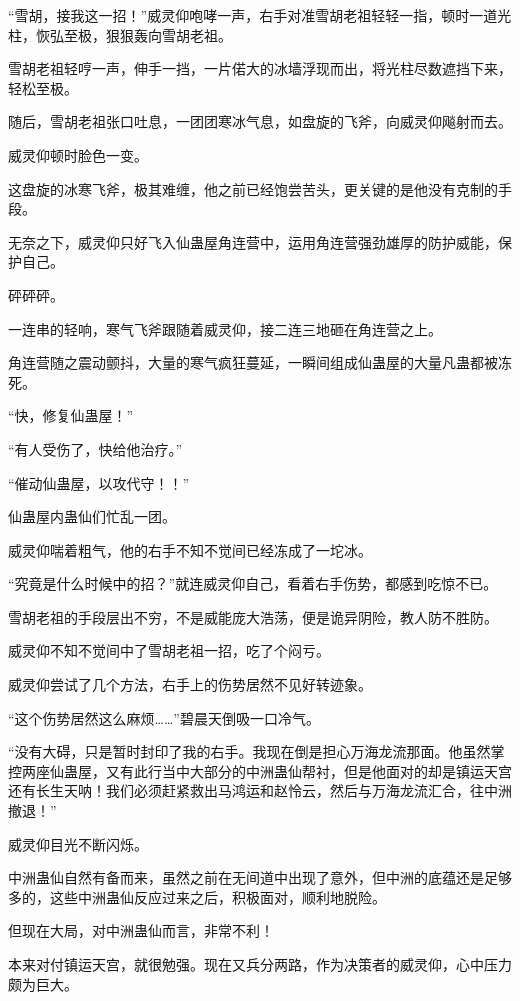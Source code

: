 
\begin{this_body}

“雪胡，接我这一招！”威灵仰咆哮一声，右手对准雪胡老祖轻轻一指，顿时一道光柱，恢弘至极，狠狠轰向雪胡老祖。

雪胡老祖轻哼一声，伸手一挡，一片偌大的冰墙浮现而出，将光柱尽数遮挡下来，轻松至极。

随后，雪胡老祖张口吐息，一团团寒冰气息，如盘旋的飞斧，向威灵仰飚射而去。

威灵仰顿时脸色一变。

这盘旋的冰寒飞斧，极其难缠，他之前已经饱尝苦头，更关键的是他没有克制的手段。

无奈之下，威灵仰只好飞入仙蛊屋角连营中，运用角连营强劲雄厚的防护威能，保护自己。

砰砰砰。

一连串的轻响，寒气飞斧跟随着威灵仰，接二连三地砸在角连营之上。

角连营随之震动颤抖，大量的寒气疯狂蔓延，一瞬间组成仙蛊屋的大量凡蛊都被冻死。

“快，修复仙蛊屋！”

“有人受伤了，快给他治疗。”

“催动仙蛊屋，以攻代守！！”

仙蛊屋内蛊仙们忙乱一团。

威灵仰喘着粗气，他的右手不知不觉间已经冻成了一坨冰。

“究竟是什么时候中的招？”就连威灵仰自己，看着右手伤势，都感到吃惊不已。

雪胡老祖的手段层出不穷，不是威能庞大浩荡，便是诡异阴险，教人防不胜防。

威灵仰不知不觉间中了雪胡老祖一招，吃了个闷亏。

威灵仰尝试了几个方法，右手上的伤势居然不见好转迹象。

“这个伤势居然这么麻烦……”碧晨天倒吸一口冷气。

“没有大碍，只是暂时封印了我的右手。我现在倒是担心万海龙流那面。他虽然掌控两座仙蛊屋，又有此行当中大部分的中洲蛊仙帮衬，但是他面对的却是镇运天宫还有长生天呐！我们必须赶紧救出马鸿运和赵怜云，然后与万海龙流汇合，往中洲撤退！”

威灵仰目光不断闪烁。

中洲蛊仙自然有备而来，虽然之前在无间道中出现了意外，但中洲的底蕴还是足够多的，这些中洲蛊仙反应过来之后，积极面对，顺利地脱险。

但现在大局，对中洲蛊仙而言，非常不利！

本来对付镇运天宫，就很勉强。现在又兵分两路，作为决策者的威灵仰，心中压力颇为巨大。


\end{this_body}
